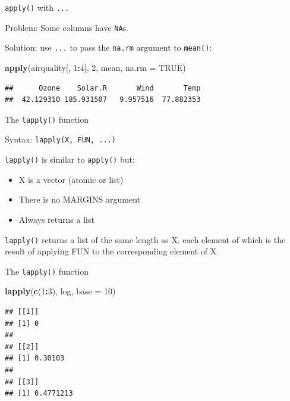 \documentclass[ignorenonframetext,]{beamer}
\newenvironment{Shaded}{\begin{snugshade}}{\end{snugshade}}
\newcommand{\DataTypeTok}[1]{\textcolor[rgb]{0.13,0.29,0.53}{#1}}
\newcommand{\DecValTok}[1]{\textcolor[rgb]{0.00,0.00,0.81}{#1}}
\newcommand{\KeywordTok}[1]{\textcolor[rgb]{0.13,0.29,0.53}{\textbf{#1}}}
\newcommand{\NormalTok}[1]{#1}
\newcommand{\OperatorTok}[1]{\textcolor[rgb]{0.81,0.36,0.00}{\textbf{#1}}}
\newcommand{\OtherTok}[1]{\textcolor[rgb]{0.56,0.35,0.01}{#1}}
\providecommand{\tightlist}{%
  \setlength{\itemsep}{0pt}\setlength{\parskip}{0pt}}
\begin{document}
\begin{frame}[fragile]{\texttt{apply()} with \texttt{...}}
\protect\hypertarget{apply-with-...-2}{}

Problem: Some columns have \texttt{NA}s.

Solution: use \texttt{...} to pass the \texttt{na.rm} argument to
\texttt{mean()}:

\begin{Shaded}
\begin{Highlighting}[]
\KeywordTok{apply}\NormalTok{(airquality[, }\DecValTok{1}\OperatorTok{:}\DecValTok{4}\NormalTok{], }\DecValTok{2}\NormalTok{, mean, }\DataTypeTok{na.rm =} \OtherTok{TRUE}\NormalTok{)}
\end{Highlighting}
\end{Shaded}

\begin{verbatim}
##      Ozone    Solar.R       Wind       Temp 
##  42.129310 185.931507   9.957516  77.882353
\end{verbatim}

\end{frame}

\begin{frame}[fragile]{The \texttt{lapply()} function}
\protect\hypertarget{the-lapply-function}{}

Syntax: \texttt{lapply(X,\ FUN,\ ...)}

\texttt{lapply()} is similar to \texttt{apply()} but:

\begin{itemize}
\tightlist
\item
  X is a vector (atomic or list)
\item
  There is no MARGINS argument
\item
  Always returns a list
\end{itemize}

\texttt{lapply()} returns a list of the same length as X, each element
of which is the result of applying FUN to the corresponding element of
X.

\end{frame}

\begin{frame}[fragile]{The \texttt{lapply()} function}
\protect\hypertarget{the-lapply-function-1}{}

\begin{Shaded}
\begin{Highlighting}[]
\KeywordTok{lapply}\NormalTok{(}\KeywordTok{c}\NormalTok{(}\DecValTok{1}\OperatorTok{:}\DecValTok{3}\NormalTok{), log, }\DataTypeTok{base =} \DecValTok{10}\NormalTok{)}
\end{Highlighting}
\end{Shaded}

\begin{verbatim}
## [[1]]
## [1] 0
## 
## [[2]]
## [1] 0.30103
## 
## [[3]]
## [1] 0.4771213
\end{verbatim}

\end{frame}
\end{document}
